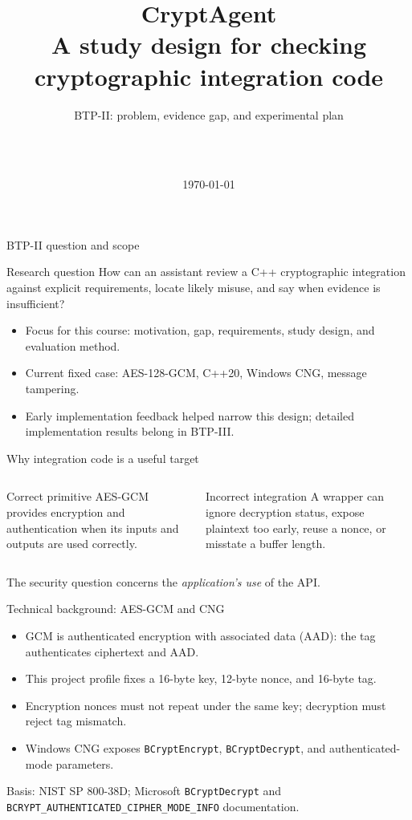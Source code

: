 \documentclass[aspectratio=169,10pt]{beamer}
\title[CryptAgent: BTP-II]{CryptAgent\\A study design for checking cryptographic integration code}
\subtitle{BTP-II: problem, evidence gap, and experimental plan}
\author[Three-member team]{\mone\\[0.2em]\mtwo\\[0.2em]\mthree}
\institute{Three-member BTP project team}
\date{\today}
\begin{document}
\begin{frame}\titlepage\end{frame}

\begin{frame}{BTP-II question and scope}
\begin{block}{Research question}
How can an assistant review a C++ cryptographic integration against explicit requirements, locate likely misuse, and say when evidence is insufficient?
\end{block}
\begin{itemize}
\item Focus for this course: motivation, gap, requirements, study design, and evaluation method.
\item Current fixed case: AES-128-GCM, C++20, Windows CNG, message tampering.
\item Early implementation feedback helped narrow this design; detailed implementation results belong in BTP-III.
\end{itemize}
\end{frame}

\begin{frame}{Why integration code is a useful target}
\begin{columns}[T]
\begin{block}{Correct primitive}
AES-GCM provides encryption and authentication when its inputs and outputs are used correctly.
\end{block}
\begin{alertblock}{Incorrect integration}
A wrapper can ignore decryption status, expose plaintext too early, reuse a nonce, or misstate a buffer length.
\end{alertblock}
\end{columns}
\vspace{0.6em}
\centering\large The security question concerns the \emph{application's use} of the API.
\end{frame}

\begin{frame}{Technical background: AES-GCM and CNG}
\begin{itemize}
\item GCM is authenticated encryption with associated data (AAD): the tag authenticates ciphertext and AAD.
\item This project profile fixes a 16-byte key, 12-byte nonce, and 16-byte tag.
\item Encryption nonces must not repeat under the same key; decryption must reject tag mismatch.
\item Windows CNG exposes \texttt{BCryptEncrypt}, \texttt{BCryptDecrypt}, and authenticated-mode parameters.
\end{itemize}
\vfill
{\scriptsize Basis: NIST SP 800-38D; Microsoft \texttt{BCryptDecrypt} and \texttt{BCRYPT\_AUTHENTICATED\_CIPHER\_MODE\_INFO} documentation.}
\end{frame}
\end{document}
